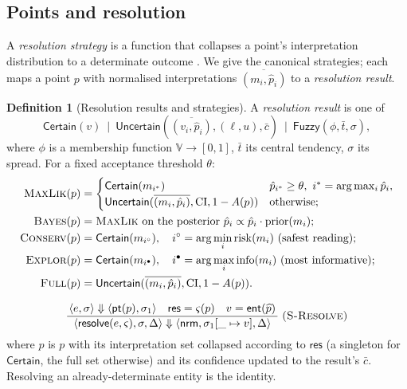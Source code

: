 \documentclass[11pt,a4paper]{article}
\theoremstyle{plain}
\theoremstyle{definition}
\newtheorem{definition}[theorem]{Definition}
\theoremstyle{remark}
\newcommand{\rn}[1]{\textsc{#1}}                          %
\newcommand{\evalto}{\Downarrow}
\newcommand{\env}{\sigma}
\newcommand{\Val}{\mathbb{V}}
\newcommand{\Unit}{[0,1]}
\newcommand{\nrm}{\mathsf{nrm}}
\newcommand{\Strat}{\varsigma}
\newcommand{\infrule}[3]{%
  \ensuremath{\displaystyle\frac{\,#2\,}{\,#3\,}}\;\rn{(#1)}}
\begin{document}
\subsection{Points and resolution}
\label{sec:resolution}

A \emph{resolution strategy} is a function that collapses a point's
interpretation distribution to a determinate outcome
\citep{kozen1981,mciver2005}. We give the canonical strategies; each maps a
point $p$ with normalised interpretations $\overline{(m_i,\hat p_i)}$ to a
\emph{resolution result}.

\begin{definition}[Resolution results and strategies]
\label{def:resolution}
A \emph{resolution result} is one of
\[
\mathsf{Certain}(v)\ \mid\ \mathsf{Uncertain}(\overline{(v_i,\hat p_i)},
(\ell,u),\bar c)\ \mid\ \mathsf{Fuzzy}(\phi,\bar t,\sigma),
\]
where $\phi$ is a membership function $\Val\to\Unit$, $\bar t$ its central
tendency, $\sigma$ its spread. For a fixed acceptance threshold $\theta$:
\begin{align*}
\textsc{MaxLik}(p)&=\begin{cases}
  \mathsf{Certain}(m_{i^\ast}) & \hat p_{i^\ast}\ge\theta,\ i^\ast=\arg\max_i
   \hat p_i,\\
  \mathsf{Uncertain}(\overline{(m_i,\hat p_i)},\mathrm{CI},1-A(p)) &
   \text{otherwise;}\end{cases}\\
\textsc{Bayes}(p)&=\textsc{MaxLik}\ \text{on the posterior } \hat p_i\propto
   \hat p_i\cdot\mathrm{prior}(m_i);\\
\textsc{Conserv}(p)&=\mathsf{Certain}(m_{i^\circ}),\quad
   i^\circ=\arg\min_i \mathrm{risk}(m_i)\ \text{(safest reading)};\\
\textsc{Explor}(p)&=\mathsf{Certain}(m_{i^\bullet}),\quad
   i^\bullet=\arg\max_i \mathrm{info}(m_i)\ \text{(most informative)};\\
\textsc{Full}(p)&=\mathsf{Uncertain}(\overline{(m_i,\hat p_i)},\mathrm{CI},
   1-A(p)).
\end{align*}
\end{definition}

\begin{gather*}
\infrule{S-Resolve}{\langle e,\env\rangle\evalto\langle\mathsf{pt}(p),\env_1
                    \rangle\quad
                    \mathsf{res}=\Strat(p)\quad v=\mathsf{ent}(\widehat{p})}
                   {\langle\mathsf{resolve}(e,\Strat),\env,\Delta\rangle
                    \evalto\langle\nrm,\env_1[\_\mapsto v],\Delta\rangle}
\end{gather*}
where $\widehat p$ is $p$ with its interpretation set collapsed according to
$\mathsf{res}$ (a singleton for $\mathsf{Certain}$, the full set otherwise) and
its confidence updated to the result's $\bar c$. Resolving an already-determinate
entity is the identity.
\end{document}
